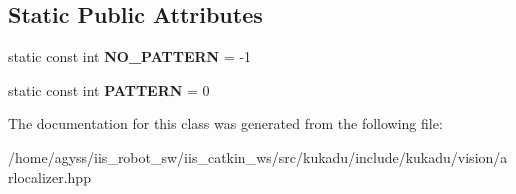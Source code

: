 \subsection*{Static Public Attributes}
\begin{DoxyCompactItemize}
\item 
static const int {\bfseries N\+O\+\_\+\+P\+A\+T\+T\+E\+RN} = -\/1\hypertarget{classkukadu_1_1ARTag2D_ab546f20eb5acdde48c099c9a2bff1325}{}\label{classkukadu_1_1ARTag2D_ab546f20eb5acdde48c099c9a2bff1325}

\item 
static const int {\bfseries P\+A\+T\+T\+E\+RN} = 0\hypertarget{classkukadu_1_1ARTag2D_a0b377ec0bc76b87578268124f5a646cc}{}\label{classkukadu_1_1ARTag2D_a0b377ec0bc76b87578268124f5a646cc}

\end{DoxyCompactItemize}


The documentation for this class was generated from the following file\+:\begin{DoxyCompactItemize}
\item 
/home/agyss/iis\+\_\+robot\+\_\+sw/iis\+\_\+catkin\+\_\+ws/src/kukadu/include/kukadu/vision/arlocalizer.\+hpp\end{DoxyCompactItemize}
